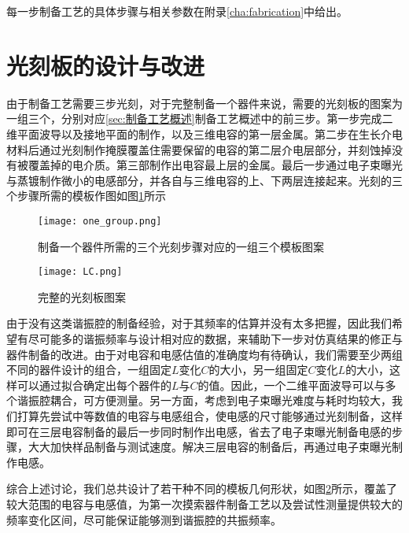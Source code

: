             每一步制备工艺的具体步骤与相关参数在附录\ref{cha:fabrication}中给出。
            





        \section{光刻板的设计与改进} %
        \label{sec:光刻板的设计}

            由于制备工艺需要三步光刻，对于完整制备一个器件来说，需要的光刻板的图案为一组三个，分别对应\ref{sec:制备工艺概述}制备工艺概述中的前三步。第一步完成二维平面波导以及接地平面的制作，以及三维电容的第一层金属。第二步在生长介电材料后通过光刻制作掩膜覆盖住需要保留的电容的第二层介电层部分，并刻蚀掉没有被覆盖掉的电介质。第三部制作出电容最上层的金属。最后一步通过电子束曝光与蒸镀制作微小的电感部分，并各自与三维电容的上、下两层连接起来。光刻的三个步骤所需的模板作图如图\ref{fig:one_group}所示
            

            \begin{figure}[h]
                \centering
                \texttt{[image: one\_group.png]}
                \caption{制备一个器件所需的三个光刻步骤对应的一组三个模板图案}
                \label{fig:one_group}
            \end{figure}

            \begin{figure}[h]
                \centering
                \texttt{[image: LC.png]}
                \caption{完整的光刻板图案}
                \label{fig:LC}
            \end{figure}

            由于没有这类谐振腔的制备经验，对于其频率的估算并没有太多把握，因此我们希望有尽可能多的谐振频率与设计相对应的数据，来辅助下一步对仿真结果的修正与器件制备的改进。由于对电容和电感估值的准确度均有待确认，我们需要至少两组不同的器件设计的组合，一组固定$L$变化$C$的大小，另一组固定$C$变化$L$的大小，这样可以通过拟合确定出每个器件的$L$与$C$的值。因此，一个二维平面波导可以与多个谐振腔耦合，可方便测量。另一方面，考虑到电子束曝光难度与耗时均较大，我们打算先尝试中等数值的电容与电感组合，使电感的尺寸能够通过光刻制备，这样即可在三层电容制备的最后一步同时制作出电感，省去了电子束曝光制备电感的步骤，大大加快样品制备与测试速度。解决三层电容的制备后，再通过电子束曝光制作电感。

            综合上述讨论，我们总共设计了若干种不同的模板几何形状，如图\ref{fig:LC}所示，覆盖了较大范围的电容与电感值，为第一次摸索器件制备工艺以及尝试性测量提供较大的频率变化区间，尽可能保证能够测到谐振腔的共振频率。





